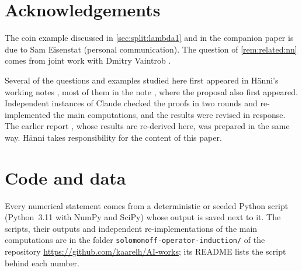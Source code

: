 \section*{Acknowledgements}
The coin example discussed in \cref{sec:split:lambda1} and in the companion paper is due to Sam Eisenstat (personal communication). The question of \cref{rem:related:nn} comes from joint work with Dmitry Vaintrob \citep{vaintrobhanni2026nnbayes}.

Several of the questions and examples studied here first appeared in H\"anni's working notes \citep{hanni2026notes}, most of them in the note \citep{hanni2026grokking}, where the proposal also first appeared. Independent instances of Claude checked the proofs in two rounds and re-implemented the main computations, and the results were revised in response. The earlier report \citep{claude2026whatfollows}, whose results are re-derived here, was prepared in the same way. H\"anni takes responsibility for the content of this paper.

\section*{Code and data}
Every numerical statement comes from a deterministic or seeded Python script (Python~3.11 with NumPy and SciPy) whose output is saved next to it. The scripts, their outputs and independent re-implementations of the main computations are in the folder \texttt{solomonoff-operator-induction/} of the repository \url{https://github.com/kaarelh/AI-works}; its README lists the script behind each number.
